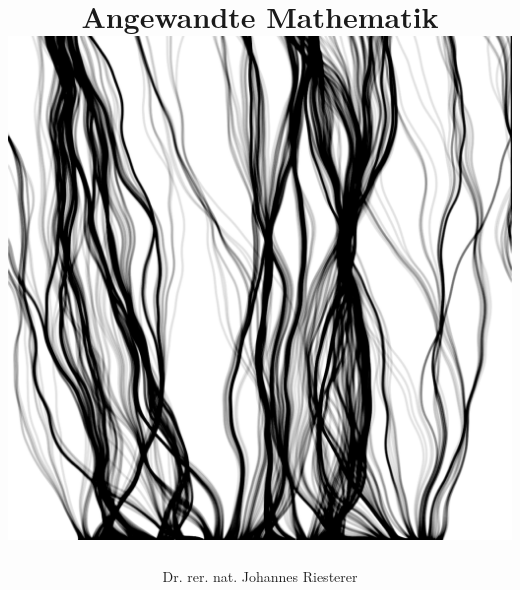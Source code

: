 \documentclass{beamer}
\begin{document}
\title[Angewandte Mathematik] %
{Angewandte Mathematik
\\
\includegraphics[scale=0.15]{images/cover}
}
\subtitle{}
\author[Dr. Johannes Riesterer] %
{Dr.  rer. nat. Johannes Riesterer}

\date[KPT 2004] %
{}

\subject{Angewandte Mathematik}



\frame{\titlepage}
\end{document}
